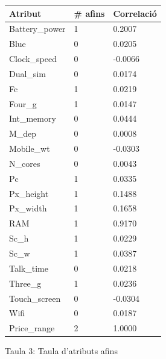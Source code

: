 \documentclass[a4paper, 11pt]{article}
\begin{document}
\begin{figure}[h] %
\begin{minipage}{7cm} %
\begin{center}
    \begin{tabular}{l|l|l}
        \textbf{Atribut} & \textbf{\# afins} & \textbf{Correlació}\\\hline\hline
        \rowcolor{lightapricot}
        Battery\_power & 1 & 0.2007\\\hline
        Blue &  0 & 0.0205\\\hline
        Clock\_speed & 0 & -0.0066\\\hline
        Dual\_sim & 0 & 0.0174\\\hline
        Fc & 1 & 0.0219\\\hline
        Four\_g & 1 & 0.0147\\\hline
        Int\_memory & 0 & 0.0444\\\hline
        M\_dep & 0 & 0.0008 \\\hline
        Mobile\_wt & 0 & -0.0303 \\\hline
        N\_cores & 0 & 0.0043\\\hline
        Pc & 1 & 0.0335\\\hline
        Px\_height & 1 & 0.1488\\\hline
        Px\_width & 1 & 0.1658\\\hline
        \rowcolor{lightapricot}
        RAM &  1 & 0.9170\\\hline
        Sc\_h & 1 & 0.0229\\\hline
        Sc\_w & 1 & 0.0387\\\hline
        Talk\_time & 0 & 0.0218 \\\hline
        Three\_g & 1 & 0.0236\\\hline
        Touch\_screen & 0 & -0.0304 \\\hline
        Wifi & 0 & 0.0187\\\hline
        Price\_range & 2 & 1.0000\\
    \end{tabular}
    Taula 3: Taula d'atributs afins
    \setcounter{table}{2}
    \label{tab:afins}
\end{center}
\end{minipage} %
\hspace{2em}
\begin{minipage}{7cm} %

\end{minipage}
\end{figure}
\end{document}
